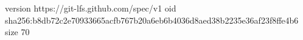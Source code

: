version https://git-lfs.github.com/spec/v1
oid sha256:b8db72c2e70933665acfb767b20a6eb6b4036d8aed38b2235e36af23f8ffe4b6
size 70
